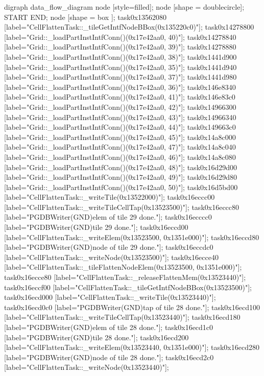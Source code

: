 digraph data_flow_diagram {
	node [style=filled];
	node [shape = doublecircle]; START END;
	node [shape = box ];
	task0x13562080 [label="CellFlattenTask::_tileGetIntfNodeBBox(0x135220c0)"];
	task0x14278800 [label="Grid::_loadPartInstIntfConn()(0x17e42aa0, 40)"];
	task0x14278840 [label="Grid::_loadPartInstIntfConn()(0x17e42aa0, 39)"];
	task0x14278880 [label="Grid::_loadPartInstIntfConn()(0x17e42aa0, 38)"];
	task0x1441d900 [label="Grid::_loadPartInstIntfConn()(0x17e42aa0, 35)"];
	task0x1441d940 [label="Grid::_loadPartInstIntfConn()(0x17e42aa0, 37)"];
	task0x1441d980 [label="Grid::_loadPartInstIntfConn()(0x17e42aa0, 36)"];
	task0x146e8340 [label="Grid::_loadPartInstIntfConn()(0x17e42aa0, 41)"];
	task0x146e83c0 [label="Grid::_loadPartInstIntfConn()(0x17e42aa0, 42)"];
	task0x14966300 [label="Grid::_loadPartInstIntfConn()(0x17e42aa0, 43)"];
	task0x14966340 [label="Grid::_loadPartInstIntfConn()(0x17e42aa0, 44)"];
	task0x149663c0 [label="Grid::_loadPartInstIntfConn()(0x17e42aa0, 45)"];
	task0x14a8c000 [label="Grid::_loadPartInstIntfConn()(0x17e42aa0, 47)"];
	task0x14a8c040 [label="Grid::_loadPartInstIntfConn()(0x17e42aa0, 46)"];
	task0x14a8c080 [label="Grid::_loadPartInstIntfConn()(0x17e42aa0, 48)"];
	task0x16d29d00 [label="Grid::_loadPartInstIntfConn()(0x17e42aa0, 49)"];
	task0x16d29d80 [label="Grid::_loadPartInstIntfConn()(0x17e42aa0, 50)"];
	task0x16d5bd00 [label="CellFlattenTask::_writeTile(0x13522000)"];
	task0x16eccc00 [label="CellFlattenTask::_writeTileCellTap(0x13523500)"];
	task0x16eccc80 [label="PGDBWriter(GND)\nCell elem of tile 29 done."];
	task0x16ecccc0 [label="PGDBWriter(GND)\nCell tile 29 done."];
	task0x16eccd00 [label="CellFlattenTask::_writeElem(0x13523500, 0x1351e000)"];
	task0x16eccd80 [label="PGDBWriter(GND)\nCell node of tile 29 done."];
	task0x16eccdc0 [label="CellFlattenTask::_writeNode(0x13523500)"];
	task0x16ecce40 [label="CellFlattenTask::_tileFlattenNodeElem(0x13523500, 0x1351e000)"];
	task0x16ecce80 [label="CellFlattenTask::_releaseFlattenMem(0x13523440)"];
	task0x16eccf00 [label="CellFlattenTask::_tileGetIntfNodeBBox(0x13523500)"];
	task0x16ecd000 [label="CellFlattenTask::_writeTile(0x13523440)"];
	task0x16ecd0c0 [label="PGDBWriter(GND)\nCell tap of tile 28 done."];
	task0x16ecd100 [label="CellFlattenTask::_writeTileCellTap(0x13523440)"];
	task0x16ecd180 [label="PGDBWriter(GND)\nCell elem of tile 28 done."];
	task0x16ecd1c0 [label="PGDBWriter(GND)\nCell tile 28 done."];
	task0x16ecd200 [label="CellFlattenTask::_writeElem(0x13523440, 0x1351e000)"];
	task0x16ecd280 [label="PGDBWriter(GND)\nCell node of tile 28 done."];
	task0x16ecd2c0 [label="CellFlattenTask::_writeNode(0x13523440)"];
}
